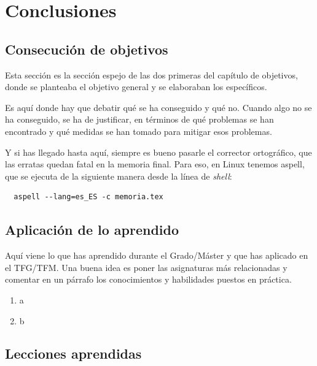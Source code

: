 
\cleardoublepage
\chapter{Conclusiones}
\label{chap:conclusiones}


\section{Consecución de objetivos}
\label{sec:consecucion-objetivos}

Esta sección es la sección espejo de las dos primeras del capítulo de objetivos, donde se planteaba el objetivo general y se elaboraban los específicos.

Es aquí donde hay que debatir qué se ha conseguido y qué no. 
Cuando algo no se ha conseguido, se ha de justificar, en términos de qué problemas se han encontrado y qué medidas se han tomado para mitigar esos problemas.

Y si has llegado hasta aquí, siempre es bueno pasarle el corrector ortográfico, que las erratas quedan fatal en la memoria final.
Para eso, en Linux tenemos aspell, que se ejecuta de la siguiente manera desde la línea de \emph{shell}:

\begin{verbatim}
  aspell --lang=es_ES -c memoria.tex
\end{verbatim}

\section{Aplicación de lo aprendido}
\label{sec:aplicacion}

Aquí viene lo que has aprendido durante el Grado/Máster y que has aplicado en el TFG/TFM.
Una buena idea es poner las asignaturas más relacionadas y comentar en un párrafo los conocimientos y habilidades puestos en práctica.

\begin{enumerate}
  \item a
  \item b
\end{enumerate}


\section{Lecciones aprendidas}
\label{sec:lecciones_aprendidas}


